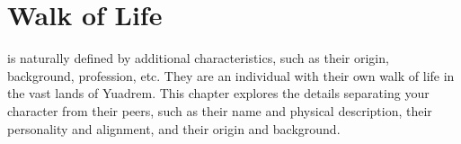 \chapter{Walk of Life}
is naturally defined by additional characteristics, such as their origin, background, profession, etc.
They are an individual with their own walk of life in the vast lands of Yuadrem.
This chapter explores the details separating your character from their peers, such as their name and physical description, their personality and alignment, and their origin and background.




